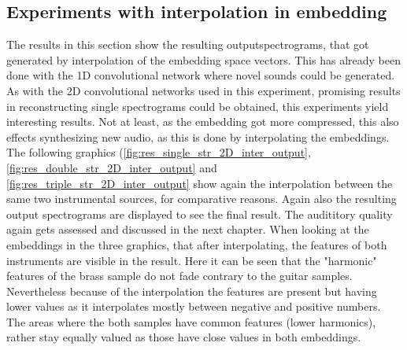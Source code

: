 \subsection{Experiments with interpolation in embedding}
The results in this section show the resulting outputspectrograms, that got generated by interpolation of the embedding space vectors. This has already been done with the 1D convolutional network where novel sounds could be generated. As with the 2D convolutional networks used in this experiment, promising results in reconstructing single spectrograms could be obtained, this experiments yield interesting results. Not at least, as the embedding got more compressed, this also effects synthesizing new audio, as this is done by interpolating the embeddings. The following graphics (\ref{fig:res_single_str_2D_inter_output}, \ref{fig:res_double_str_2D_inter_output} and \ref{fig:res_triple_str_2D_inter_output} show again the interpolation between the same two instrumental sources, for comparative reasons. Again also the resulting output spectrograms are displayed to see the final result. The audititory quality again gets assessed and discussed in the next chapter.
When looking at the embeddings in the three graphics, that after interpolating, the features of both instruments are visible in the result. Here it can be seen that the "harmonic" features of the brass sample do not fade contrary to the guitar samples. Nevertheless because of the interpolation the features are present but having lower values as it interpolates mostly between negative and positive numbers.  The areas where the both samples have common features (lower harmonics), rather stay equally valued as those have close values in both embeddings. 

